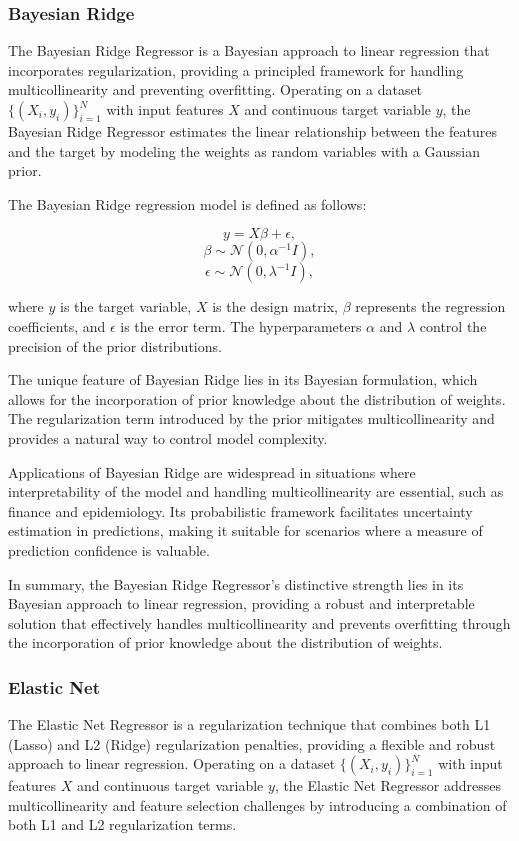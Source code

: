 \documentclass[twocolumn]{article}
\begin{document}
		\subsubsection{Bayesian Ridge}
The Bayesian Ridge Regressor is a Bayesian approach to linear regression that incorporates regularization, providing a principled framework for handling multicollinearity and preventing overfitting. Operating on a dataset \(\{(X_i, y_i)\}_{i=1}^{N}\) with input features \(X\) and continuous target variable \(y\), the Bayesian Ridge Regressor estimates the linear relationship between the features and the target by modeling the weights as random variables with a Gaussian prior.

The Bayesian Ridge regression model is defined as follows:

\[ y = X \beta + \epsilon, \]
\[ \beta \sim \mathcal{N}(0, \alpha^{-1}I), \]
\[ \epsilon \sim \mathcal{N}(0, \lambda^{-1}I), \]

where \(y\) is the target variable, \(X\) is the design matrix, \(\beta\) represents the regression coefficients, and \(\epsilon\) is the error term. The hyperparameters \(\alpha\) and \(\lambda\) control the precision of the prior distributions.

The unique feature of Bayesian Ridge lies in its Bayesian formulation, which allows for the incorporation of prior knowledge about the distribution of weights. The regularization term introduced by the prior mitigates multicollinearity and provides a natural way to control model complexity.

Applications of Bayesian Ridge are widespread in situations where interpretability of the model and handling multicollinearity are essential, such as finance and epidemiology. Its probabilistic framework facilitates uncertainty estimation in predictions, making it suitable for scenarios where a measure of prediction confidence is valuable.

In summary, the Bayesian Ridge Regressor's distinctive strength lies in its Bayesian approach to linear regression, providing a robust and interpretable solution that effectively handles multicollinearity and prevents overfitting through the incorporation of prior knowledge about the distribution of weights.

		\subsubsection{Elastic Net}
The Elastic Net Regressor is a regularization technique that combines both L1 (Lasso) and L2 (Ridge) regularization penalties, providing a flexible and robust approach to linear regression. Operating on a dataset \(\{(X_i, y_i)\}_{i=1}^{N}\) with input features \(X\) and continuous target variable \(y\), the Elastic Net Regressor addresses multicollinearity and feature selection challenges by introducing a combination of both L1 and L2 regularization terms.
\end{document}
